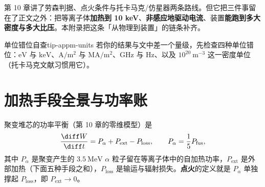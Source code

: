 
第 10 章讲了劳森判据、点火条件与托卡马克/仿星器两条路线。但它把三件事留在了正文之外：把等离子体\textbf{加热到 10 keV}、\textbf{非感应地驱动电流}、装置\textbf{能跑到多大密度与多大比压}。本附录把这条「从物理到装置」的链条补齐。

\begin{tip}{单位错位自查}{tip-appm-units}
若你的结果与文中差一个量级，先检查四种单位错位：$\mathrm{eV}$ 与 $\mathrm{keV}$、$\mathrm{A/m^2}$ 与 $\mathrm{MA/m^2}$、$\mathrm{GHz}$ 与 $\mathrm{Hz}$、以及 $\mathrm{10^{20}\ m^{-3}}$ 这一密度单位（托卡马克文献习惯用它）。
\end{tip}


\section{加热手段全景与功率账}

聚变堆芯的功率平衡（第 10 章的零维模型）是
\begin{equation}
\frac{\diff W}{\diff t}=P_\alpha+P_{\mathrm{ext}}-P_{\mathrm{loss}},
\qquad P_\alpha=\frac15 P_{\mathrm{fus}},
\end{equation}
其中 $P_\alpha$ 是聚变产生的 $3.5\ \mathrm{MeV}$ $\alpha$ 粒子留在等离子体中的自加热功率，$P_{\mathrm{ext}}$ 是外部加热（下面五种手段之和），$P_{\mathrm{loss}}$ 是输运与辐射损失。\textbf{点火}的定义就是 $P_\alpha$ 单独撑起 $P_{\mathrm{loss}}$，即 $P_{\mathrm{ext}}\to0$。

